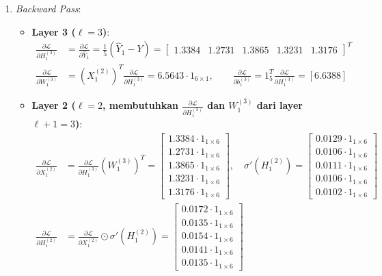 \documentclass[11pt,a4paper]{article}
\def\mathbf#1{#1}%
\theoremstyle{plain}
\theoremstyle{definition}
\theoremstyle{remark}
\begin{document}
\begin{enumerate}
    \item \textit{Backward Pass}:
    \begin{itemize}
        \item \textbf{Layer 3 ($\ell = 3$)}:
        \begin{align}
            \frac{\partial \mathcal{L}}{\partial H^{(3)}_1} &= \frac{\partial \mathcal{L}}{\partial \hat{Y}_1} = \frac{1}{5}\left(\hat{Y}_1 - Y\right) = \begin{bmatrix} 1.3384 & 1.2731 & 1.3865 & 1.3231 & 1.3176 \end{bmatrix}^T \\[0.2em]
            \frac{\partial \mathcal{L}}{\partial W^{(3)}_1} &= \left( X^{(2)}_1 \right)^T \frac{\partial \mathcal{L}}{\partial H^{(3)}_1} = 6.5643 \cdot \mathbf{1}_{6 \times 1}, \qquad
            \frac{\partial \mathcal{L}}{\partial \mathbf{b}^{(3)}_1} = \mathbf{1}_5^T \frac{\partial \mathcal{L}}{\partial H^{(3)}_1} = [6.6388]
        \end{align}
        \item \textbf{Layer 2 ($\ell = 2$, membutuhkan $\frac{\partial \mathcal{L}}{\partial H^{(3)}_1}$ dan $W^{(3)}_1$ dari layer $\ell+1 = 3$)}:
        \begin{align}
            \frac{\partial \mathcal{L}}{\partial X^{(2)}_1} &= \frac{\partial \mathcal{L}}{\partial H^{(3)}_1} \left( W^{(3)}_1 \right)^T = \begin{bmatrix} 1.3384 \cdot \mathbf{1}_{1 \times 6} \\ 1.2731 \cdot \mathbf{1}_{1 \times 6} \\ 1.3865 \cdot \mathbf{1}_{1 \times 6} \\ 1.3231 \cdot \mathbf{1}_{1 \times 6} \\ 1.3176 \cdot \mathbf{1}_{1 \times 6} \end{bmatrix}, \quad
            \sigma'\!\left(H^{(2)}_1\right) = \begin{bmatrix} 0.0129 \cdot \mathbf{1}_{1 \times 6} \\ 0.0106 \cdot \mathbf{1}_{1 \times 6} \\ 0.0111 \cdot \mathbf{1}_{1 \times 6} \\ 0.0106 \cdot \mathbf{1}_{1 \times 6} \\ 0.0102 \cdot \mathbf{1}_{1 \times 6} \end{bmatrix} \\[0.2em]
            \frac{\partial \mathcal{L}}{\partial H^{(2)}_1} &= \frac{\partial \mathcal{L}}{\partial X^{(2)}_1} \odot \sigma'\!\left(H^{(2)}_1\right) = \begin{bmatrix} 0.0172 \cdot \mathbf{1}_{1 \times 6} \\ 0.0135 \cdot \mathbf{1}_{1 \times 6} \\ 0.0154 \cdot \mathbf{1}_{1 \times 6} \\ 0.0141 \cdot \mathbf{1}_{1 \times 6} \\ 0.0135 \cdot \mathbf{1}_{1 \times 6} \end{bmatrix} \\[0.2em]

\end{align}
\end{itemize}
\end{enumerate}
\end{document}
